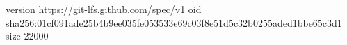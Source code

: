 version https://git-lfs.github.com/spec/v1
oid sha256:01cf091ade25b4b9ee035fe053533e69c03f8e51d5c32b0255aded1bbe65c3d1
size 22000
